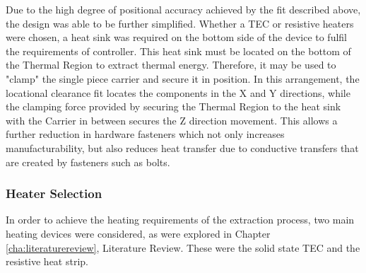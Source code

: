 Due to the high degree of positional accuracy achieved by the fit described above, the design was able to be further simplified. Whether a TEC or resistive heaters were chosen, a heat sink was required on the bottom side of the device to fulfil the requirements of controller. This heat sink must be located on the bottom of the Thermal Region to extract thermal energy. Therefore, it may be used to "clamp" the single piece carrier and secure it in position. In this arrangement, the locational clearance fit locates the components in the X and Y directions, while the clamping force provided by securing the Thermal Region to the heat sink with the Carrier in between secures the Z direction movement. This allows a further reduction in hardware fasteners which not only increases manufacturability, but also reduces heat transfer due to conductive transfers that are created by fasteners such as bolts.

\subsubsection{Heater Selection}
\label{sec:heaterselection}

In order to achieve the heating requirements of the extraction process, two main heating devices were considered, as were explored in Chapter \ref{cha:literaturereview}, Literature Review. These were the solid state TEC and the resistive heat strip.\\

